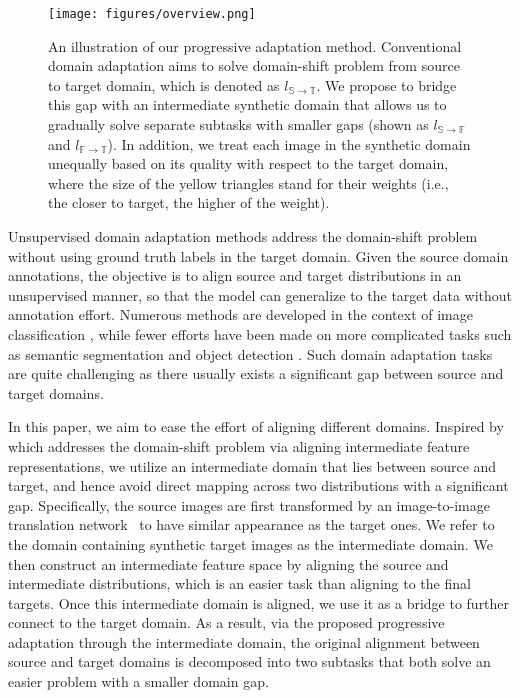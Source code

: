 \documentclass[10pt,twocolumn,letterpaper]{article}
\begin{document}
\begin{figure}[!htb]
		\begin{center}
        \texttt{[image: figures/overview.png]}
		\end{center}
		\caption{
        An illustration of our progressive adaptation method.
Conventional domain adaptation aims to solve domain-shift problem from source to target domain, which is denoted as $l_{\mathbb{S} \rightarrow \mathbb{T}}$.
We propose to bridge this gap with an intermediate synthetic domain that allows us to gradually solve separate subtasks with smaller gaps (shown as $l_{\mathbb{S} \rightarrow \mathbb{F}}$ and $l_{\mathbb{F} \rightarrow \mathbb{T}}$).
In addition, we treat each image in the synthetic domain unequally based on its quality with respect to the target domain, where the size of the yellow triangles stand for their weights (i.e., the closer to target, the higher of the weight).
		}
		\label{fig:overview}
\vspace{-2mm}
\end{figure}

Unsupervised domain adaptation methods address the domain-shift problem without using ground truth labels in the target domain.
Given the source domain annotations, the objective is to align source and target distributions in an unsupervised manner, so that the model can generalize to the target data without annotation effort.
Numerous methods are developed in the context of image classification \cite{Tzeng2014DeepDC, pmlr-v37-long15, Long2017DeepTL, sun2016deep, gopalan2011domain, Tzeng2017AdversarialDD, ganin2016domain, Bousmalis2016DomainSN}, while fewer efforts have been made on more complicated tasks such as semantic segmentation \cite{Hoffman2016FCNsIT, Tsai_adaptseg_2018} and object detection \cite{hoffman2014lsda, chen2018domain, Inoue_2018_CVPR}.
Such domain adaptation tasks are quite challenging as there usually exists a significant gap between source and target domains.


In this paper, we aim to ease the effort of aligning different domains.
Inspired by \cite{gopalan2011domain} which addresses the domain-shift problem via aligning intermediate feature representations, we utilize an intermediate domain that lies between source and target, and hence avoid direct mapping across two distributions with a significant gap.
Specifically, the source images are first transformed by an image-to-image translation network~\cite{CycleGAN2017} to have similar appearance as the target ones. We refer to the domain containing synthetic target images as the intermediate domain.
We then construct an intermediate feature space by aligning the source and intermediate distributions, which is an easier task than aligning to the final targets.
Once this intermediate domain is aligned, we use it as a bridge to further connect to the target domain.
As a result, via the proposed progressive adaptation through the intermediate domain, the original alignment between source and target domains is decomposed into two subtasks that both solve an easier problem with a smaller domain gap.
\end{document}
